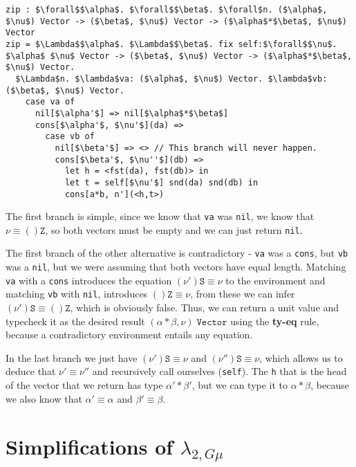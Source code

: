\begin{lstlisting}[mathescape=true, basicstyle=\ttfamily]
zip : $\forall$$\alpha$. $\forall$$\beta$. $\forall$n. ($\alpha$, $\nu$) Vector -> ($\beta$, $\nu$) Vector -> ($\alpha$*$\beta$, $\nu$) Vector
zip = $\Lambda$$\alpha$. $\Lambda$$\beta$. fix self:$\forall$$\nu$. $\alpha$ $\nu$ Vector -> ($\beta$, $\nu$) Vector -> ($\alpha$*$\beta$, $\nu$) Vector.
  $\Lambda$n. $\lambda$va: ($\alpha$, $\nu$) Vector. $\lambda$vb: ($\beta$, $\nu$) Vector.
    case va of
      nil[$\alpha'$] => nil[$\alpha$*$\beta$]
      cons[$\alpha'$, $\nu'$](da) =>
        case vb of
          nil[$\beta'$] => <> // This branch will never happen.
          cons[$\beta'$, $\nu''$](db) =>
            let h = <fst(da), fst(db)> in
            let t = self[$\nu'$] snd(da) snd(db) in
            cons[a*b, n'](<h,t>)
\end{lstlisting}

The first branch is simple, since we know that \texttt{va} was \texttt{nil}, we know that $\nu \equiv ()\texttt{Z}$, so both vectors must be empty and we can just return \texttt{nil}.

The first branch of the other alternative is contradictory - \texttt{va} was a \texttt{cons}, but \texttt{vb} was a \texttt{nil}, but we were assuming that both vectors have equal length. Matching \texttt{va} with a \texttt{cons} introduces the equation $(\nu') \texttt{S} \equiv \nu$ to the environment and matching \texttt{vb} with \texttt{nil}, introduces $() \texttt{Z} \equiv \nu$, from these we can infer $(\nu') \texttt{S} \equiv () \texttt{Z}$, which is obviously false. Thus, we can return a unit value and typecheck it as the desired result $(\alpha * \beta, \nu) \; \texttt{Vector}$ using the \textbf{ty-eq} rule, because a contradictory environment entails any equation.

In the last branch we just have $(\nu') \texttt{S} \equiv \nu$ and $(\nu'') \texttt{S} \equiv \nu$, which allows us to deduce that $\nu' \equiv \nu''$ and recursively call ourselves (\texttt{self}). The \texttt{h} that is the head of the vector that we return has type $\alpha' * \beta'$, but we can type it to $\alpha * \beta$, because we also know that $\alpha' \equiv \alpha$ and $\beta' \equiv \beta$.

\section{Simplifications of $\lambda_{2,G\mu}$}
\label{simplifications}


